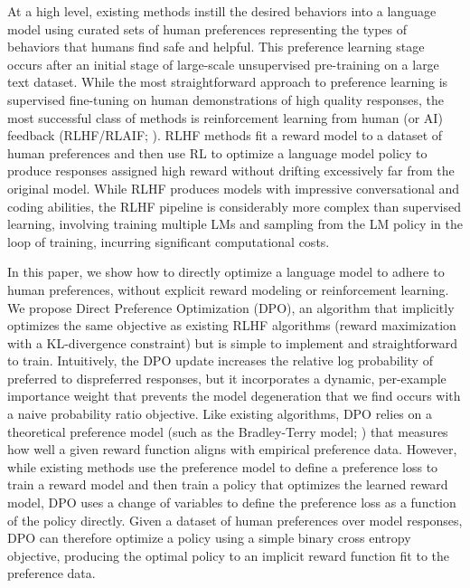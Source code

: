 \documentclass{article}
\begin{document}
At a high level, existing methods instill the desired behaviors into a language model using curated sets of human preferences representing the types of behaviors that humans find safe and helpful. This preference learning stage occurs after an initial stage of large-scale unsupervised pre-training on a large text dataset. While the most straightforward approach to preference learning is supervised fine-tuning on human demonstrations of high quality responses, the most successful class of methods is reinforcement learning from human (or AI) feedback (RLHF/RLAIF; \citep{christiano2017deep,bai2022constitutional}). RLHF methods fit a reward model to a dataset of human preferences and then use RL to optimize a language model policy to produce responses assigned high reward without drifting excessively far from the original model. While RLHF produces models with impressive conversational and coding abilities, the RLHF pipeline is considerably more complex than supervised learning, involving training multiple LMs and sampling from the LM policy in the loop of training, incurring significant computational costs.

In this paper, we show how to directly optimize a language model to adhere to human preferences, without explicit reward modeling or reinforcement learning.
We propose
Direct Preference Optimization (DPO), an algorithm that implicitly optimizes the same objective as existing RLHF algorithms (reward maximization with a KL-divergence constraint) but is simple to implement and straightforward to train. Intuitively, the DPO update increases the relative log probability of preferred to dispreferred responses, but it incorporates a dynamic, per-example importance weight that prevents the model degeneration that we find occurs with a naive probability ratio objective. Like existing algorithms, DPO relies on a theoretical preference model (such as the Bradley-Terry model; \cite{bradley1952rankanalysis}) that measures how well a given reward function aligns with empirical preference data. However, while existing methods use the preference model to define a preference loss to train a reward model and then train a policy that optimizes the learned reward model, DPO uses a change of variables to define the preference loss as a function of the policy directly. Given a dataset of human preferences over model responses, DPO can therefore optimize a policy using a simple binary cross entropy objective, producing the optimal policy to an implicit reward function fit to the preference data.
\end{document}
